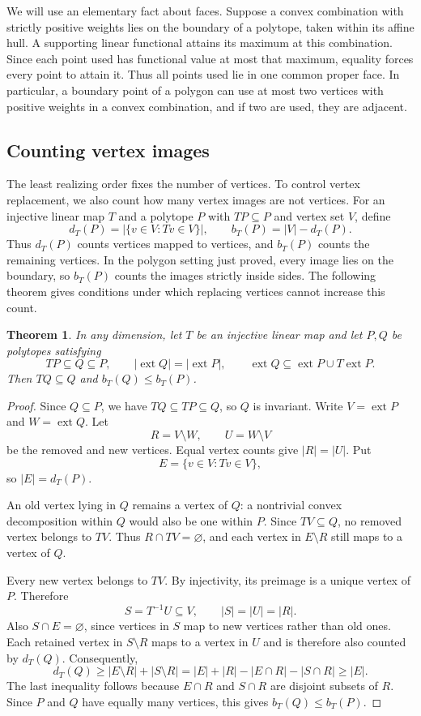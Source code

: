 \documentclass[11pt,a4paper]{article}
\DeclareMathOperator{\ext}{ext}
\newtheorem{theorem}{Theorem}[section]
\theoremstyle{definition}
\theoremstyle{remark}
\numberwithin{equation}{section}
\begin{document}
We will use an elementary fact about faces. Suppose a convex combination with strictly positive weights lies on the boundary of a polytope, taken within its affine hull. A supporting linear functional attains its maximum at this combination. Since each point used has functional value at most that maximum, equality forces every point to attain it. Thus all points used lie in one common proper face. In particular, a boundary point of a polygon can use at most two vertices with positive weights in a convex combination, and if two are used, they are adjacent.

\subsection{Counting vertex images}
The least realizing order fixes the number of vertices. To control vertex replacement, we also count how many vertex images are not vertices. For an injective linear map $T$ and a polytope $P$ with $TP\subseteq P$ and vertex set $V$, define
\[
 d_T(P)=|\{v\in V:Tv\in V\}|,\qquad
 b_T(P)=|V|-d_T(P).
\]
Thus $d_T(P)$ counts vertices mapped to vertices, and $b_T(P)$ counts the remaining vertices. In the polygon setting just proved, every image lies on the boundary, so $b_T(P)$ counts the images strictly inside sides. The following theorem gives conditions under which replacing vertices cannot increase this count.

\begin{theorem}\label{thm:branching}
In any dimension, let $T$ be an injective linear map and let $P,Q$ be polytopes satisfying
\[
 TP\subseteq Q\subseteq P,\qquad
 |\ext Q|=|\ext P|,\qquad
 \ext Q\subseteq\ext P\cup T\ext P.
\]
Then $TQ\subseteq Q$ and $b_T(Q)\le b_T(P)$.
\end{theorem}
\begin{proof}
Since $Q\subseteq P$, we have $TQ\subseteq TP\subseteq Q$, so $Q$ is invariant. Write $V=\ext P$ and $W=\ext Q$. Let
\[
 R=V\setminus W,\qquad U=W\setminus V
\]
be the removed and new vertices. Equal vertex counts give $|R|=|U|$. Put
\[
 E=\{v\in V:Tv\in V\},
\]
so $|E|=d_T(P)$.

An old vertex lying in $Q$ remains a vertex of $Q$: a nontrivial convex decomposition within $Q$ would also be one within $P$. Since $TV\subseteq Q$, no removed vertex belongs to $TV$. Thus $R\cap TV=\varnothing$, and each vertex in $E\setminus R$ still maps to a vertex of $Q$.

Every new vertex belongs to $TV$. By injectivity, its preimage is a unique vertex of $P$. Therefore
\[
 S=T^{-1}U\subseteq V,\qquad |S|=|U|=|R|.
\]
Also $S\cap E=\varnothing$, since vertices in $S$ map to new vertices rather than old ones. Each retained vertex in $S\setminus R$ maps to a vertex in $U$ and is therefore also counted by $d_T(Q)$. Consequently,
\[
 d_T(Q)\ge |E\setminus R|+|S\setminus R|
 =|E|+|R|-|E\cap R|-|S\cap R|
 \ge |E|.
\]
The last inequality follows because $E\cap R$ and $S\cap R$ are disjoint subsets of $R$. Since $P$ and $Q$ have equally many vertices, this gives $b_T(Q)\le b_T(P)$.
\end{proof}
\end{document}
